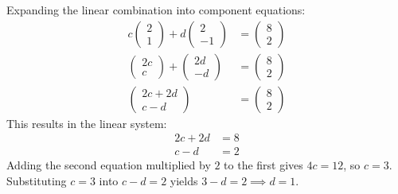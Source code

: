 \begin{solution}
    Expanding the linear combination into component equations:
    \begin{align*}
        c \begin{pmatrix} 2 \\ 1 \end{pmatrix} + d \begin{pmatrix} 2 \\ -1 \end{pmatrix} &= \begin{pmatrix} 8 \\ 2 \end{pmatrix} \\ 
        \begin{pmatrix} 2c \\ c \end{pmatrix} + \begin{pmatrix} 2d \\ -d \end{pmatrix} &= \begin{pmatrix} 8 \\ 2 \end{pmatrix} \\ 
        \begin{pmatrix} 2c + 2d \\ c - d \end{pmatrix} &= \begin{pmatrix} 8 \\ 2 \end{pmatrix}
    \end{align*}
    This results in the linear system:
    \begin{align*}
        2c + 2d &= 8 \\ 
        c - d &= 2 
    \end{align*}
    Adding the second equation multiplied by $2$ to the first gives $4c = 12$, so $c = 3$. Substituting $c = 3$ into $c - d = 2$ yields $3 - d = 2 \implies d = 1$.
\end{solution}
\newpage 

